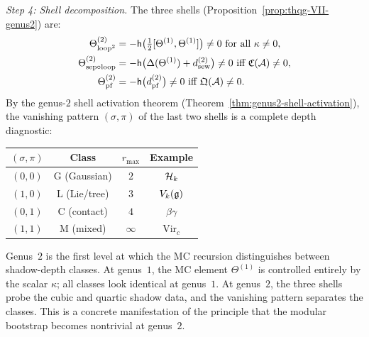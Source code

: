 \begin{computation}
\medskip\noindent\emph{Step 4: Shell decomposition.} The
three shells (Proposition~\ref{prop:thqg-VII-genus2}) are:
\begin{align}
\Theta^{(2)}_{\mathrm{loop}^2}
&= -\mathsf{h}\bigl(\tfrac{1}{2}[\Theta^{(1)},\Theta^{(1)}]\bigr)
\neq 0 \text{ for all $\kappa \neq 0$},
\label{eq:thqg-VII-shell-loop2}\\
\Theta^{(2)}_{\mathrm{sep}\circ\mathrm{loop}}
&= -\mathsf{h}\bigl(\Delta(\Theta^{(1)}) + d_{\mathrm{sew}}^{(2)}\bigr)
\neq 0 \text{ iff } \mathfrak{C}(\mathcal{A}) \neq 0,
\label{eq:thqg-VII-shell-sep}\\
\Theta^{(2)}_{\mathrm{pf}}
&= -\mathsf{h}\bigl(d_{\mathrm{pf}}^{(2)}\bigr)
\neq 0 \text{ iff } \mathfrak{Q}(\mathcal{A}) \neq 0.
\label{eq:thqg-VII-shell-pf}
\end{align}
By the genus-$2$ shell activation theorem
(Theorem~\ref{thm:genus2-shell-activation}), the vanishing pattern
$(\sigma,\pi)$ of the last two shells is a complete depth
diagnostic:
\begin{center}
\begin{tabular}{cccc}
$(\sigma,\pi)$ & Class & $r_{\max}$ & Example \\
\hline
$(0,0)$ & G (Gaussian) & $2$ & $\mathcal{H}_k$ \\
$(1,0)$ & L (Lie/tree) & $3$ & $V_k(\mathfrak{g})$ \\
$(0,1)$ & C (contact) & $4$ & $\beta\gamma$ \\
$(1,1)$ & M (mixed) & $\infty$ & $\mathrm{Vir}_c$
\end{tabular}
\end{center}
\end{computation}

\begin{remark}
\label{rem:thqg-VII-genus2-diagnostic}
Genus~$2$ is the first level at which the MC recursion
distinguishes between shadow-depth classes. At genus~$1$,
the MC element $\Theta^{(1)}$ is controlled entirely by the scalar
$\kappa$; all classes look identical at genus~$1$. At genus~$2$,
the three shells probe the cubic and quartic shadow data, and the
vanishing pattern separates the classes. This is a concrete
manifestation of the principle that the modular bootstrap becomes
nontrivial at genus~$2$.
\end{remark}

%
%

